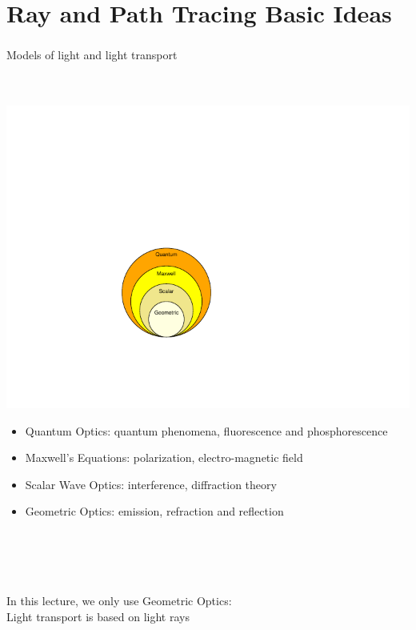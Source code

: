 \documentclass[utf8,stillsansserifmath,fleqn,t]{beamer}
\begin{document}
\section{Ray and Path Tracing Basic Ideas}

\begin{frame}
\frametitle{\insertsection}
Models of light and light transport\\~\\~\\
\begin{minipage}{0.29\textwidth}
\centerline{\includegraphics[width=\textwidth]{./fig/optics-models.pdf}}
\end{minipage}\hfill
\begin{minipage}{0.7\textwidth}
\begin{itemize}
\item Quantum Optics: quantum phenomena, fluorescence and phosphorescence
\item Maxwell's Equations: polarization, electro-magnetic field
\item Scalar Wave Optics: interference, diffraction theory %
\item Geometric Optics: emission, refraction and reflection
\end{itemize}
\end{minipage}\\~\\~\\~\\
In this lecture, we only use Geometric Optics:\\
Light transport is based on light rays
\end{frame}
\end{document}
